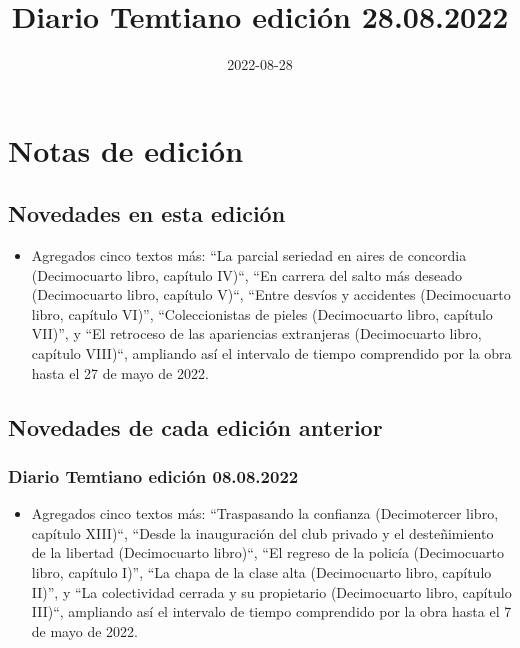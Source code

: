 \documentclass[
]{book}
\title{Diario Temtiano edición 28.08.2022}
\author{}
\date{\vspace{-2.5em}2022-08-28}
\providecommand{\tightlist}{%
  \setlength{\itemsep}{0pt}\setlength{\parskip}{0pt}}
\begin{document}
\maketitle

{
\setcounter{tocdepth}{1}
\tableofcontents
}
\hypertarget{notas-de-ediciuxf3n}{%
\chapter*{Notas de edición}\label{notas-de-ediciuxf3n}}

\hypertarget{novedades-en-esta-ediciuxf3n}{%
\section*{Novedades en esta edición}\label{novedades-en-esta-ediciuxf3n}}

\begin{itemize}
\tightlist
\item
  Agregados cinco textos más: ``La parcial seriedad en aires de concordia (Decimocuarto libro, capítulo IV)``, ``En carrera del salto más deseado (Decimocuarto libro, capítulo V)``, ``Entre desvíos y accidentes (Decimocuarto libro, capítulo VI)'', ``Coleccionistas de pieles (Decimocuarto libro, capítulo VII)'', y ``El retroceso de las apariencias extranjeras (Decimocuarto libro, capítulo VIII)``, ampliando así el intervalo de tiempo comprendido por la obra hasta el 27 de mayo de 2022.
\end{itemize}

\hypertarget{novedades-de-cada-ediciuxf3n-anterior}{%
\section*{Novedades de cada edición anterior}\label{novedades-de-cada-ediciuxf3n-anterior}}

\hypertarget{diario-temtiano-ediciuxf3n-08.08.2022}{%
\subsection*{Diario Temtiano edición 08.08.2022}\label{diario-temtiano-ediciuxf3n-08.08.2022}}

\begin{itemize}
\tightlist
\item
  Agregados cinco textos más: ``Traspasando la confianza (Decimotercer libro, capítulo XIII)``, ``Desde la inauguración del club privado y el desteñimiento de la libertad (Decimocuarto libro)``, ``El regreso de la policía (Decimocuarto libro, capítulo I)'', ``La chapa de la clase alta (Decimocuarto libro, capítulo II)'', y ``La colectividad cerrada y su propietario (Decimocuarto libro, capítulo III)``, ampliando así el intervalo de tiempo comprendido por la obra hasta el 7 de mayo de 2022.
\end{itemize}
\end{document}
